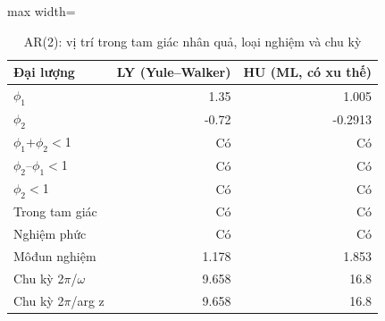 \begin{table}[H]
\centering\footnotesize
\caption{AR(2): vị trí trong tam giác nhân quả, loại nghiệm và chu kỳ}\label{tab:tab_b11_08_ar2_triangle}
\begin{adjustbox}{max width=\linewidth}
\begin{tabular}{|l|r|r|}
\toprule
Đại lượng & LY (Yule–Walker) & HU (ML, có xu thế) \\
\midrule
$\phi_{1}$ & 1.35 & 1.005 \\
$\phi_{2}$ & -0.72 & -0.2913 \\
$\phi_{1}$+$\phi_{2}<$1 & Có & Có \\
$\phi_{2}$–$\phi_{1}<$1 & Có & Có \\
\textbar{}$\phi_{2}$\textbar{}$<$1 & Có & Có \\
Trong tam giác & Có & Có \\
Nghiệm phức & Có & Có \\
Môđun nghiệm & 1.178 & 1.853 \\
Chu kỳ 2$\pi$/$\omega$ & 9.658 & 16.8 \\
Chu kỳ 2$\pi$/\textbar{}arg z\textbar{} & 9.658 & 16.8 \\
\bottomrule
\end{tabular}
\end{adjustbox}
\end{table}

